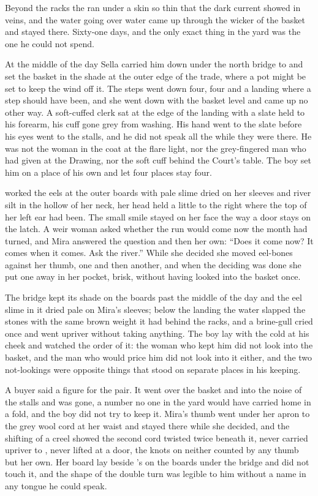 Beyond the racks the  ran under a skin so thin that the dark current showed in veins, and the water going over water came up through the wicker of the basket and stayed there. Sixty-one days, and the only exact thing in the yard was the one he could not spend.

\scenebreak

At the middle of the day Sella carried him down under the north bridge to  and set the basket in the shade at the outer edge of the trade, where a pot might be set to keep the wind off it. The steps went down four, four and a landing where a step should have been, and she went down with the basket level and came up no other way. A soft-cuffed clerk sat at the edge of the landing with a slate held to his forearm, his cuff gone grey from washing. His hand went to the slate before his eyes went to the stalls, and he did not speak all the while they were there. He was not the woman in the coat at the flare light, nor the grey-fingered man who had given at the Drawing, nor the soft cuff behind the Court's table. The boy set him on a place of his own and let four places stay four.

 worked the eels at the outer boards with pale slime dried on her sleeves and river silt in the hollow of her neck, her head held a little to the right where the top of her left ear had been. The small smile stayed on her face the way a door stays on the latch. A weir woman asked whether the run would come now the month had turned, and Mira answered the question and then her own: “Does it come now? It comes when it comes. Ask the river.” While she decided she moved eel-bones against her thumb, one and then another, and when the deciding was done she put one away in her pocket, brisk, without having looked into the basket once.

The bridge kept its shade on the boards past the middle of the day and the eel slime in it dried pale on Mira's sleeves; below the landing the water slapped the stones with the same brown weight it had behind the racks, and a brine-gull cried once and went upriver without taking anything. The boy lay with the cold at his cheek and watched the order of it: the woman who kept him did not look into the basket, and the man who would price him did not look into it either, and the two not-lookings were opposite things that stood on separate places in his keeping.

A buyer said a figure for the pair. It went over the basket and into the noise of the stalls and was gone, a number no one in the yard would have carried home in a fold, and the boy did not try to keep it. Mira's thumb went under her apron to the grey wool cord at her waist and stayed there while she decided, and the shifting of a creel showed the second cord twisted twice beneath it, never carried upriver to , never lifted at a door, the knots on neither counted by any thumb but her own. Her board lay beside 's  on the boards under the bridge and did not touch it, and the shape of the double turn was legible to him without a name in any tongue he could speak.


